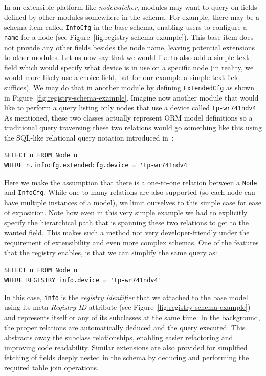 \documentclass[5p,sort&compress]{elsarticle}
\newcommand{\nodewatcher}{\textit{nodewatcher}}
\begin{document}
In an extensible platform like \nodewatcher{}, modules may want to query on fields defined by other modules somewhere in the schema.
For example, there may be a schema item called \texttt{InfoCfg} in the base schema, enabling users to configure a \texttt{name} for a node (see Figure~\ref{fig:registry-schema-example}).
This base item does not provide any other fields besides the node name, leaving potential extensions to other modules.
Let us now say that we would like to also add a simple text field which would specify what device is in use on a specific node (in reality, we would more likely use a choice field, but for our example a simple text field suffices).
We may do that in another module by defining \texttt{ExtendedCfg} as shown in Figure~\ref{fig:registry-schema-example}.
Imagine now another module that would like to perform a query listing only nodes that use a device called \texttt{tp-wr741ndv4}.
As mentioned, these two classes actually represent ORM model definitions so a traditional query traversing these two relations would go something like this using the SQL-like relational query notation introduced in~\cite{ONeil_2008}:
\begin{verbatim}
SELECT n FROM Node n
WHERE n.infocfg.extendedcfg.device = 'tp-wr741ndv4'
\end{verbatim}

Here we make the assumption that there is a one-to-one relation between a \texttt{Node} and \texttt{InfoCfg}.
While one-to-many relations are also supported (so each node can have multiple instances of a model), we limit ourselves to this simple case for ease of exposition.
Note how even in this very simple example we had to explicitly specify the hierarchical path that is spanning these two relations to get to the wanted field.
This makes such a method not very developer-friendly under the requirement of extensibility and even more complex schemas.
One of the features that the registry enables, is that we can simplify the same query as:
\begin{verbatim}
SELECT n FROM Node n
WHERE REGISTRY info.device = 'tp-wr741ndv4'
\end{verbatim}

In this case, \texttt{info} is the \textit{registry identifier} that we attached to the base model using its meta \textit{Registry ID} attribute (see Figure~\ref{fig:registry-schema-example}) and represents itself or any of its subclasses at the same time.
In the background, the proper relations are automatically deduced and the query executed.
This abstracts away the subclass relationships, enabling easier refactoring and improving code readability.
Similar extensions are also provided for simplified fetching of fields deeply nested in the schema by deducing and performing the required table join operations.
\end{document}
